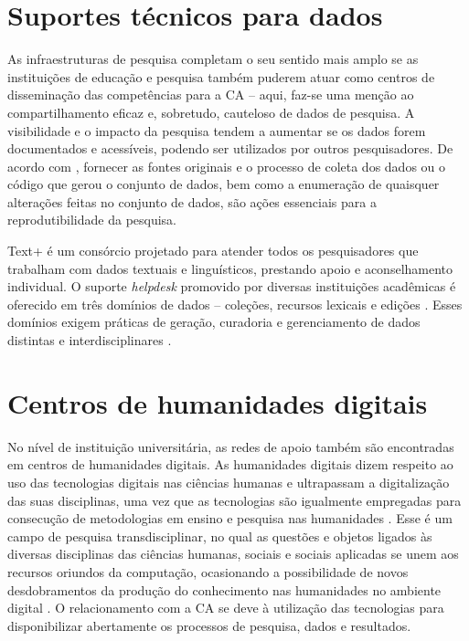 \documentclass[portuguese]{textolivre}
\begin{document}
\section{Suportes técnicos para dados}\label{sec-fmt-manuscrito}
As infraestruturas de pesquisa completam o seu sentido mais amplo se as instituições de educação e pesquisa também puderem atuar como centros de disseminação das competências para a CA – aqui, faz-se uma menção ao compartilhamento eficaz e, sobretudo, cauteloso de dados de pesquisa. A visibilidade e o impacto da pesquisa tendem a aumentar se os dados forem documentados e acessíveis, podendo ser utilizados por outros pesquisadores. De acordo com \textcite{stodden2009}, fornecer as fontes originais e o processo de coleta dos dados ou o código que gerou o conjunto de dados, bem como a enumeração de quaisquer alterações feitas no conjunto de dados, são ações essenciais para a reprodutibilidade da pesquisa.

Text+ é um consórcio projetado para atender todos os pesquisadores que trabalham com dados textuais e linguísticos, prestando apoio e aconselhamento individual. O suporte \textit{helpdesk} promovido por diversas instituições acadêmicas é oferecido em três domínios de dados – coleções, recursos lexicais e edições \cite{textplus2024}. Esses domínios exigem práticas de geração, curadoria e gerenciamento de dados distintas e interdisciplinares \cite{nfdi2024}.


\section{Centros de humanidades digitais}\label{sec-formato}
No nível de instituição universitária, as redes de apoio também são encontradas em centros de humanidades digitais. As humanidades digitais dizem respeito ao uso das tecnologias digitais nas ciências humanas \cite{adams2012} e ultrapassam a digitalização das suas disciplinas, uma vez que as tecnologias são igualmente empregadas para consecução de metodologias em ensino e pesquisa nas humanidades \cite{bailey2017}. Esse é um campo de pesquisa transdisciplinar, no qual as questões e objetos ligados às diversas disciplinas das ciências humanas, sociais e sociais aplicadas se unem aos recursos oriundos da computação, ocasionando a possibilidade de novos desdobramentos da produção do conhecimento nas humanidades no ambiente digital \cite{cuartas2017}. O relacionamento com a CA se deve à utilização das tecnologias para disponibilizar abertamente os processos de pesquisa, dados e resultados.
\end{document}

